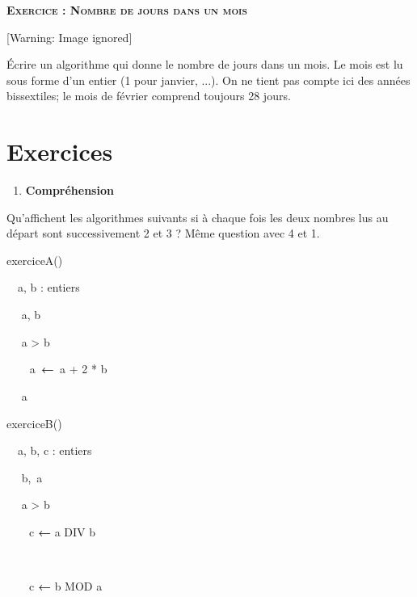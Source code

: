 {\sffamily\bfseries\scshape
Exercice : Nombre de jours dans un mois}

\begin{center}
 [Warning: Image ignored] %

\end{center}
{
Écrire un algorithme qui donne le nombre de jours dans un mois. Le mois
est lu sous forme d'un entier (1 pour janvier, ...).
On ne tient pas compte ici des années bissextiles; le mois de février
comprend toujours 28 jours.}

\section{Exercices}
\liststyleExercice
\begin{enumerate}
\item {\sffamily\bfseries
Compréhension}
\end{enumerate}
{
Qu’affichent les algorithmes suivants si à chaque fois les deux nombres
lus au départ sont successivement 2 et 3 ? Même question avec 4 et 1.}

{\sffamily
{} exerciceA()}

{\sffamily
\ \ a, b : entiers}

{\sffamily
\ \  a, b}

{\sffamily
\ \  a {\textgreater} b }

{\sffamily
\texttt{\ \ \ \ }a\texttt{ }{\textbf{←}}\texttt{
}a + 2 * b}

{\sffamily
{}}

{\sffamily
\ \  a}

{\sffamily
{} }


\bigskip

{\sffamily
{} exerciceB()}

{\sffamily
\ \ a, b, c : entiers}

{\sffamily
\ \  b,~a}

{\sffamily
\ \  a {\textgreater} b }

{\sffamily
\ \ \ \ {c
}{\textbf{←}}{ a
}{DIV}{ b}}

{\sffamily
{\ \ }}

{\sffamily
{\ \ \ \ c
}{\textbf{←}}{ b
}{MOD}{ a}}

